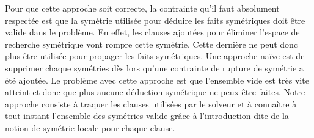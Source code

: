Pour que cette approche soit correcte, la contrainte qu'il faut absolument respectée est que la symétrie utilisée pour déduire les
faits symétriques doit être valide dans le problème. En effet, les clauses ajoutées pour éliminer l'espace de recherche
symétrique vont rompre cette symétrie. Cette dernière ne peut donc plus être utilisée pour propager les faits symétriques.
Une approche naïve est de supprimer chaque symétries dès lors qu'une contrainte de rupture de symétrie a été ajoutée.
Le problème avec cette approche est que l'ensemble vide est très vite atteint et donc que plus aucune déduction symétrique ne peux être faites. Notre approche consiste à traquer les clauses utilisées par le solveur et à connaître à tout instant l'ensemble des symétries valide grâce à l'introduction dite de la notion de symétrie locale pour chaque clause.

\vspace{2em}

\begin{table}[!htbp]\footnotesize
	\centering
	\caption{Comparaison des approches sur les instances SAT.}
	\label{tab:satfr}
\end{table}%


